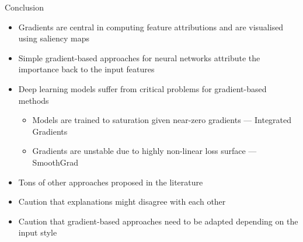 \documentclass[11pt,compress,t,notes=noshow, aspectratio=169, xcolor=table]{beamer}
\begin{document}
\begin{frame}{Conclusion}
\begin{itemize}
    \item Gradients are central in computing feature attributions and are visualised using
saliency maps
\item Simple gradient-based approaches for neural networks attribute the importance back to
the input features
\item Deep learning models suffer from critical problems for gradient-based methods
\begin{itemize}
    \item Models are trained to saturation given near-zero gradients — Integrated Gradients
    \item Gradients are unstable due to highly non-linear loss surface — SmoothGrad
\end{itemize}
\item Tons of other approaches proposed in the literature
\item Caution that explanations might disagree with each other
\item Caution that gradient-based approaches need to be adapted depending on the input
style
\end{itemize}
\end{frame}

\endlecture
\end{document}
